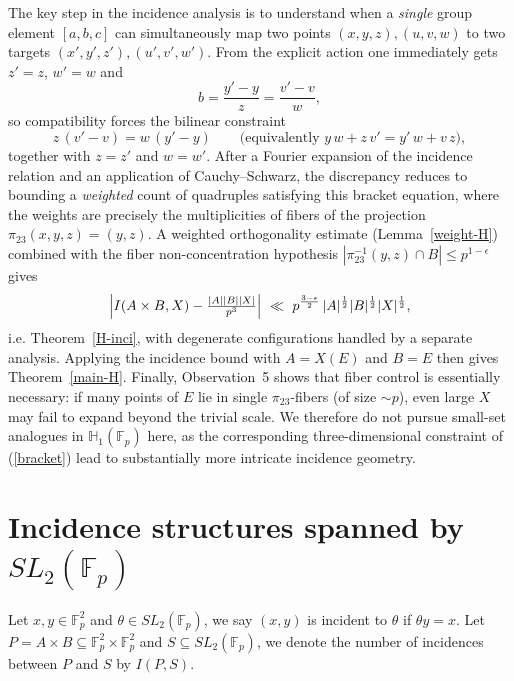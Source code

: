 \documentclass[11pt]{article}
\def\F{\mathcal{F}}
\def\Fbb{\mathbb{F}}
\def \F{{\mathbb F}}
\def\SL{SL}
\def\l({\left(}
\def\r){\right)}
\begin{document}
The key step in the incidence analysis is to understand when a \emph{single} group element
$[a,b,c]$ can simultaneously map two points $(x,y,z),(u,v,w)$ to two targets
$(x',y',z'),(u',v',w')$.  From the explicit action one immediately gets $z'=z$, $w'=w$ and
\[
b=\frac{y'-y}{z}=\frac{v'-v}{w},
\]
so compatibility forces the bilinear constraint
\begin{equation}\label{bracket}
z\,(v'-v)=w\,(y'-y)
\qquad
\text{(equivalently } y\,w+z\,v'=y'\,w+v\,z\text{)},
\end{equation}
together with $z=z'$ and $w=w'$.  After a Fourier expansion of the incidence relation and an
application of Cauchy--Schwarz, the discrepancy reduces to bounding a \emph{weighted} count of
quadruples satisfying this bracket equation, where the weights are precisely the multiplicities of
fibers of the projection $\pi_{23}(x,y,z)=(y,z)$.  A weighted orthogonality estimate
(Lemma~\ref{weight-H}) combined with the fiber non-concentration hypothesis
$|\pi_{23}^{-1}(y,z)\cap B|\le p^{1-\epsilon}$ gives
\[
\Bigl|I(A\times B,X)-\tfrac{|A||B||X|}{p^{3}}\Bigr|
\ \ll\ p^{\frac{3-\epsilon}{2}}\,|A|^{\frac{1}{2}}|B|^{\frac{1}{2}}|X|^{\frac{1}{2}},
\]
i.e. Theorem~\ref{H-inci}, with degenerate configurations handled by a
separate analysis.
Applying the incidence bound with $A=X(E)$ and $B=E$ then gives Theorem~\ref{main-H}.
Finally, Observation~5 shows that fiber control is essentially necessary: if many points of $E$
lie in single $\pi_{23}$-fibers (of size $\sim p$), even large $X$ may fail to expand beyond the
trivial scale.  We therefore do not pursue small-set analogues in $\mathbb{H}_1(\F_p)$ here, as the
corresponding three-dimensional constraint of (\ref{bracket}) lead to substantially more intricate incidence
geometry.




\section{Incidence structures spanned by \texorpdfstring{$SL_2(\mathbb{F}_p)$}{SL2(Fp)}}
Let $x,y \in \Fbb_p^2$ and $\theta \in \SL_2 \l( \Fbb_p \r) $, we say $(x,y)$ is incident to $\theta$ if $\theta y=x$. Let $P=A\times B \subseteq \Fbb_p^2 \times \Fbb_p^2$ and $S\subseteq \SL_2 \l( \Fbb_p \r) $, we denote the number of incidences between $P$ and $S$ by $I(P,S)$.
\end{document}
